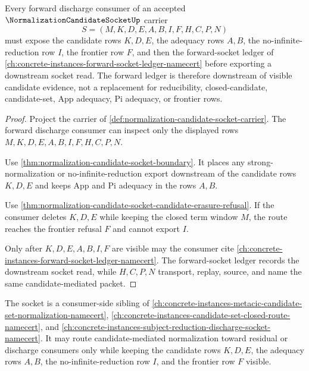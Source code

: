 \begin{theorem}
\label{thm:normalization-candidate-socket-forward-dependency}
Every forward discharge consumer of an accepted $\NormalizationCandidateSocketUp$ carrier
$$
S=(M,K,D,E,A,B,I,F,H,C,P,N)
$$
must expose the candidate rows $K,D,E$, the adequacy rows $A,B$, the no-infinite-reduction row $I$, the frontier row $F$, and then the forward-socket ledger of \autoref{ch:concrete-instances-forward-socket-ledger-namecert} before exporting a downstream socket read. The forward ledger is therefore downstream of visible candidate evidence, not a replacement for reducibility, closed-candidate, candidate-set, App adequacy, Pi adequacy, or frontier rows.
\end{theorem}
\begin{proof}
Project the carrier of \autoref{def:normalization-candidate-socket-carrier}. The forward discharge consumer can inspect only the displayed rows $M,K,D,E,A,B,I,F,H,C,P,N$.

Use \autoref{thm:normalization-candidate-socket-boundary}. It places any strong-normalization or no-infinite-reduction export downstream of the candidate rows $K,D,E$ and keeps App and Pi adequacy in the rows $A,B$.

Use \autoref{thm:normalization-candidate-socket-candidate-erasure-refusal}. If the consumer deletes $K,D,E$ while keeping the closed term window $M$, the route reaches the frontier refusal $F$ and cannot export $I$.

Only after $K,D,E,A,B,I,F$ are visible may the consumer cite \autoref{ch:concrete-instances-forward-socket-ledger-namecert}. The forward-socket ledger records the downstream socket read, while $H,C,P,N$ transport, replay, source, and name the same candidate-mediated packet.
\end{proof}

The socket is a consumer-side sibling of \autoref{ch:concrete-instances-metacic-candidate-set-normalization-namecert}, \autoref{ch:concrete-instances-candidate-set-closed-route-namecert}, and \autoref{ch:concrete-instances-subject-reduction-discharge-socket-namecert}. It may route candidate-mediated normalization toward residual or discharge consumers only while keeping the candidate rows $K,D,E$, the adequacy rows $A,B$, the no-infinite-reduction row $I$, and the frontier row $F$ visible.


